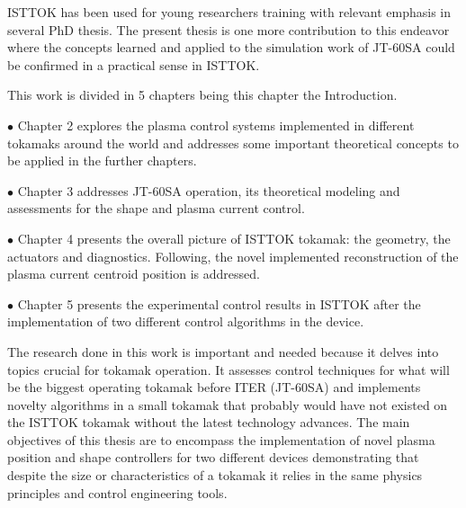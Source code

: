 ISTTOK has been used for young researchers training with relevant 
emphasis in several PhD thesis. The present thesis is one more contribution to this endeavor where the concepts learned and applied to the simulation work of JT-60SA  could be confirmed in a practical sense in ISTTOK. \smallskip

This work is divided in 5 chapters being this chapter the Introduction.\smallskip

$\bullet$ Chapter 2 explores the plasma control systems implemented in different tokamaks around the world and addresses some important theoretical concepts to be applied in the further chapters.\smallskip

$\bullet$ Chapter 3 addresses JT-60SA operation, its theoretical modeling and assessments for the shape and plasma current control.\smallskip

$\bullet$ Chapter 4 presents the overall picture of ISTTOK tokamak: the geometry, the actuators and diagnostics. Following, the novel  implemented  reconstruction of the plasma current centroid position is addressed.\smallskip

$\bullet$ Chapter 5  presents the experimental control results in ISTTOK after the implementation of two different control algorithms in the device. \smallskip

The research done in this work is important and needed because it delves into topics crucial for tokamak operation. It assesses control techniques for what will be the biggest operating tokamak before ITER (JT-60SA) and implements novelty algorithms in a small tokamak that probably would have not  existed on the ISTTOK tokamak without the latest technology advances. The main objectives of this thesis are to encompass the implementation of novel  plasma position and shape controllers for two different devices demonstrating that despite the size or characteristics of a tokamak it relies in the same physics principles and control engineering tools.\smallskip 
